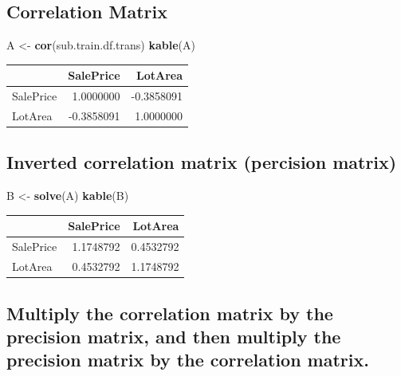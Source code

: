\documentclass[]{article}
\newenvironment{Shaded}{\begin{snugshade}}{\end{snugshade}}
\newcommand{\KeywordTok}[1]{\textcolor[rgb]{0.13,0.29,0.53}{\textbf{{#1}}}}
\newcommand{\StringTok}[1]{\textcolor[rgb]{0.31,0.60,0.02}{{#1}}}
\newcommand{\NormalTok}[1]{{#1}}
\begin{document}
\subsection{Correlation Matrix}\label{correlation-matrix}

\begin{Shaded}
\begin{Highlighting}[]
\NormalTok{A <-}\StringTok{ }\KeywordTok{cor}\NormalTok{(sub.train.df.trans)}
\KeywordTok{kable}\NormalTok{(A)}
\end{Highlighting}
\end{Shaded}

\begin{longtable}[]{@{}lrr@{}}
\toprule
& SalePrice & LotArea\tabularnewline
\midrule
\endhead
SalePrice & 1.0000000 & -0.3858091\tabularnewline
LotArea & -0.3858091 & 1.0000000\tabularnewline
\bottomrule
\end{longtable}

\subsection{Inverted correlation matrix (percision
matrix)}\label{inverted-correlation-matrix-percision-matrix}

\begin{Shaded}
\begin{Highlighting}[]
\NormalTok{B <-}\StringTok{ }\KeywordTok{solve}\NormalTok{(A)}
\KeywordTok{kable}\NormalTok{(B)}
\end{Highlighting}
\end{Shaded}

\begin{longtable}[]{@{}lrr@{}}
\toprule
& SalePrice & LotArea\tabularnewline
\midrule
\endhead
SalePrice & 1.1748792 & 0.4532792\tabularnewline
LotArea & 0.4532792 & 1.1748792\tabularnewline
\bottomrule
\end{longtable}

\subsection{Multiply the correlation matrix by the precision matrix, and
then multiply the precision matrix by the correlation
matrix.}\label{multiply-the-correlation-matrix-by-the-precision-matrix-and-then-multiply-the-precision-matrix-by-the-correlation-matrix.}

\begin{Shaded}
\end{Shaded}
\end{document}
